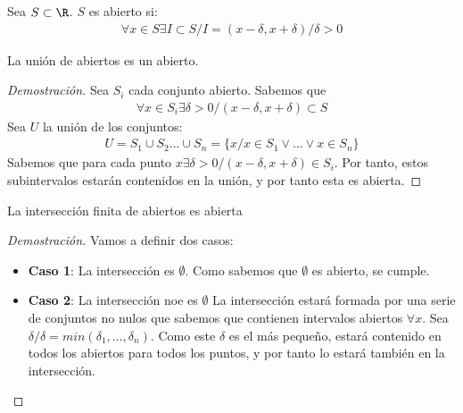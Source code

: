 \documentclass{../Topologia.tex}
\begin{document}
\begin{defin}
	Sea $S \subset \R$. $S$ es abierto si:
	\begin{equation}
		\begin{split}
			\forall x \in S \exists I \subset S / I =
			(x-\delta, x+\delta) / \delta > 0
		\end{split}
	\end{equation}
\end{defin}
\begin{prop}
	La unión de abiertos es un abierto.
\end{prop}
\begin{proof}[Demostración]
	Sea $S_{i}$ cada conjunto abierto. Sabemos que
	\begin{equation}
		\begin{split}
			\forall x \in S_{i} \exists \delta > 0 / (x-\delta, x+\delta) \subset S
		\end{split}
	\end{equation}
	Sea $U$ la unión de los conjuntos:
	\begin{equation}
		\begin{split}
			U = S_{1} \cup S_{2}\dots \cup S_{n} = 
			\{ x / x \in S_{1} \vee \dots \vee x \in S_{n} \}
		\end{split}
	\end{equation}
	Sabemos que para cada punto $x \exists \delta > 0 / (x-\delta,x+\delta) \in S_{i}$.
	Por tanto, estos subintervalos estarán contenidos en la unión, y por tanto
	esta es abierta.
\end{proof}
\begin{prop}
	La intersección finita de abiertos es abierta
\end{prop}
\begin{proof}[Demostración]
	Vamos a definir dos casos:
	\begin{itemize}
		\item \textbf{Caso 1}: La intersección es $\emptyset$. 
		Como sabemos que $\emptyset$ es abierto, se cumple.
		\item \textbf{Caso 2}: La intersección noe es $\emptyset$
		La intersección estará formada por una serie de conjuntos no nulos que
		sabemos que contienen intervalos abiertos $\forall x$. Sea $\delta
		 / \delta = min(\delta_{1}, \dots ,\delta_{n})$. Como este $\delta$
		 es el más pequeño, estará contenido en todos los abiertos para
		 todos los puntos, y por tanto lo estará también en la intersección.
	\end{itemize}
\end{proof}
\end{document}

